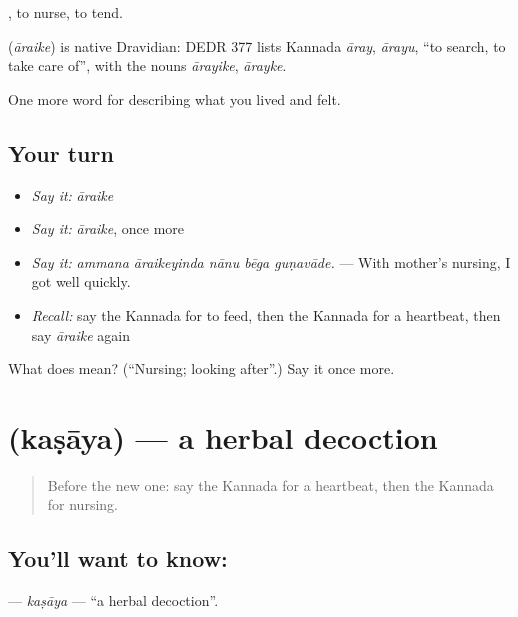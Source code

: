  , to nurse, to tend.

\begin{cousinweb}
\textbf{} (\emph{āraike}) is native Dravidian: DEDR 377 lists Kannada \emph{āray}, \emph{ārayu}, \textquotedblleft{}to search, to take care of\textquotedblright{}, with the nouns \emph{ārayike}, \emph{ārayke}.
\end{cousinweb}

\begin{grammarlens}[title={What you've built}]
One more word for describing what you lived and felt.
\end{grammarlens}

\subsection*{Your turn}
\begin{itemize}
\raggedright
  \item \emph{Say it:} \emph{āraike}
  \item \emph{Say it:} \emph{āraike}, once more
  \item \emph{Say it:} \emph{ammana āraikeyinda nānu bēga guṇavāde.} — With mother's nursing, I got well quickly.
  \item \emph{Recall:} say the Kannada for to feed, then the Kannada for a heartbeat, then say \emph{āraike} again
\end{itemize}

\begin{tcolorbox}[breakable,colback=teal!4,colframe=teal!35!black,title={Before you move on}]
What does  mean? (\textquotedblleft{}Nursing; looking after\textquotedblright{}.) Say it once more.
\end{tcolorbox}
\section[\texorpdfstring{\kn{ಕಷಾಯ} (kaṣāya)}{ಕಷಾಯ (kaṣāya)}]{ (kaṣāya) — a herbal decoction}

\label{lesson:KA-C513-kasaya}



\begin{quote}
Before the new one: say the Kannada for a heartbeat, then the Kannada for nursing.
\end{quote}

\subsection*{You'll want to know: }
\textbf{} — \emph{kaṣāya} — \textquotedblleft{}a herbal decoction\textquotedblright{}.


